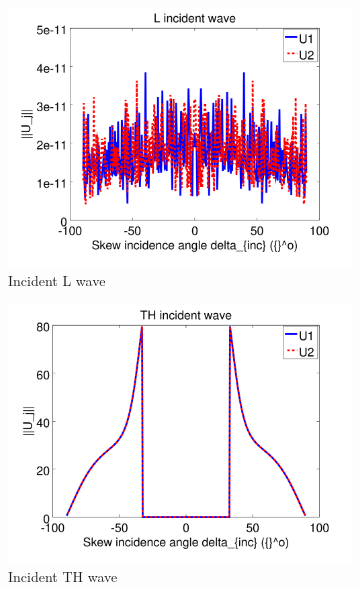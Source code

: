 \begin{figure}
\centering
\begin{subfigure}[b]{0.32\textwidth}
        \includegraphics[width=\textwidth]{images/chapter4/Resultats_3D/U1L_180_50.png}
        \caption{Incident L wave}
        \label{Resultat_3D:U1L}
    \end{subfigure}
\begin{subfigure}[b]{0.32\textwidth}
        \includegraphics[width=\textwidth]{images/chapter4/Resultats_3D/U1TH_180_50.png}
        \caption{Incident TH wave}
        \label{Resultat_3D:U1TH}
    \end{subfigure}
   \begin{subfigure}[b]{0.32\textwidth}

\end{subfigure}
\end{figure}
